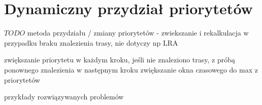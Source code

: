 \section{Dynamiczny przydział priorytetów}
\label{ch:alg-priorities-allocation}

$TODO$ metoda przydziału / zmiany priorytetów - zwiekszanie i rekalkulacja w przypadku braku znalezienia trasy, nie dotyczy np LRA

zwiększanie priorytetu w każdym kroku, jeśli nie znaleziono trasy, z próbą ponownego znalezienia w następnym kroku
zwiększanie okna czasowego do max z priorytetów

przykłady rozwiązywanych problemów